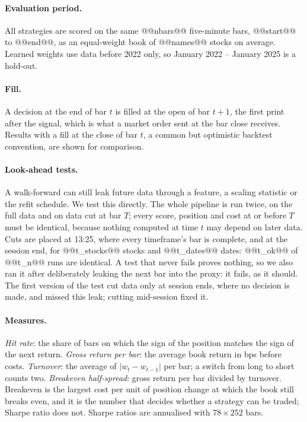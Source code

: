 \documentclass[11pt,a4paper]{article}
\begin{document}
\paragraph{Evaluation period.} All strategies are scored on the same @@nbars@@ five-minute bars, @@start@@ to
@@end@@, as an equal-weight book of @@names@@ stocks on average. Learned weights use data before 2022
only, so January 2022 -- January 2025 is a hold-out.

\paragraph{Fill.} A decision at the end of bar $t$ is filled at the open of bar $t+1$, the first print
after the signal, which is what a market order sent at the bar close receives. Results with a fill at the
close of bar $t$, a common but optimistic backtest convention, are shown for comparison.

\paragraph{Look-ahead tests.} A walk-forward can still leak future data through a feature, a scaling
statistic or the refit schedule. We test this directly. The whole pipeline is run twice, on the full data
and on data cut at bar $T$; every score, position and cost at or before $T$ must be identical, because
nothing computed at time $t$ may depend on later data. Cuts are placed at 13:25, where every timeframe's
bar is complete, and at the session end, for @@t_stocks@@ stocks and @@t_dates@@ dates: @@t_ok@@ of
@@t_n@@ runs are identical. A test that never fails proves nothing, so we also ran it after deliberately
leaking the next bar into the proxy: it fails, as it should. The first version of the test cut data
only at session ends, where no decision is made, and missed this leak; cutting mid-session fixed it.

\paragraph{Measures.} \emph{Hit rate}: the share of bars on which the sign of the position matches the sign
of the next return. \emph{Gross return per bar}: the average book return in bps before costs.
\emph{Turnover}: the average of $|w_t-w_{t-1}|$ per bar; a switch from long to short counts two.
\emph{Breakeven half-spread}: gross return per bar divided by turnover. Breakeven is the largest cost per unit
of position change at which the book still breaks even, and it is the number that decides whether a
strategy can be traded; Sharpe ratio does not. Sharpe ratios are annualised with $78\times252$ bars.
\end{document}
